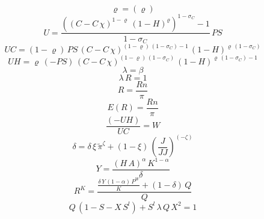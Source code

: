 \begin{dmath}
{{\varrho}}=({{\varrho}})
\end{dmath}
\begin{dmath}
{U}=\frac{\left(\left({C}-{C}\, {{\chi}}\right)^{1-{{\varrho}}}\, \left(1-{H}\right)^{{{\varrho}}}\right)^{1-{{\sigma_{C}}}}-1}{1-{{\sigma_{C}}}}\, {PS}
\end{dmath}
\begin{dmath}
{UC}=\left(1-{{\varrho}}\right)\, {PS}\, \left({C}-{C}\, {{\chi}}\right)^{\left(1-{{\varrho}}\right)\, \left(1-{{\sigma_{C}}}\right)-1}\, \left(1-{H}\right)^{{{\varrho}}\, \left(1-{{\sigma_{C}}}\right)}
\end{dmath}
\begin{dmath}
{UH}={{\varrho}}\, \left(-{PS}\right)\, \left({C}-{C}\, {{\chi}}\right)^{\left(1-{{\varrho}}\right)\, \left(1-{{\sigma_{C}}}\right)}\, \left(1-{H}\right)^{{{\varrho}}\, \left(1-{{\sigma_{C}}}\right)-1}
\end{dmath}
\begin{dmath}
{\lambda}={{\beta}}
\end{dmath}
\begin{dmath}
{\lambda}\, {R}=1
\end{dmath}
\begin{dmath}
{R}=\frac{{Rn}}{{\pi}}
\end{dmath}
\begin{dmath}
{E(R)}=\frac{{Rn}}{{\pi}}
\end{dmath}
\begin{dmath}
\frac{\left(-{UH}\right)}{{UC}}={W}
\end{dmath}
\begin{dmath}
{\delta}={\delta}\, {{\xi}}\, {\tilde{\pi}}^{{{\zeta}}}+\left(1-{{\xi}}\right)\, \left(\frac{{J}}{{JJ}}\right)^{\left(-{{\zeta}}\right)}
\end{dmath}
\begin{dmath}
{Y}=\frac{\left({H}\, {A}\right)^{{{\alpha}}}\, {K}^{1-{{\alpha}}}}{{\delta}}
\end{dmath}
\begin{dmath}
{R^{K}}=\frac{\frac{{\delta}\, {Y}\, \left(1-{{\alpha}}\right)\, {P^{W}}}{{K}}+\left(1-{{\delta}}\right)\, {Q}}{{Q}}
\end{dmath}
\begin{dmath}
{Q}\, \left(1-{S}-{X}\, {S^{l}}\right)+{S^{l}}\, {\lambda}\, {Q}\, {X}^{2}=1
\end{dmath}

